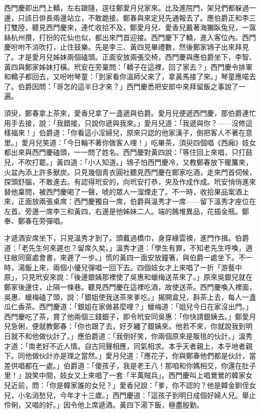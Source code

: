 西門慶即出門上轎，左右跟隨，逕往鄭愛月兒家來。比及進院門，架兒們都躲過一邊，只該日俳長兩邊站立，不敢跪接。鄭春與來定兒先通報去了。應伯爵正和李三打雙陸，聽見西門慶來，連忙收拾不及。鄭愛月兒、愛香兒戴著海獺臥兔兒，一窩絲杭州攢，打扮的花仙也似，都出來門首迎接。西門慶下了轎，進入客位內。西門慶吩咐不消吹打，止住鼓樂。先是李三、黃四見畢禮數，然後鄭家鴇子出來拜見了。才是愛月兒姊妹兩個磕頭。正面安放兩張交椅，西門慶與應伯爵坐下，李智、黃四與鄭家姊妹打橫。玳安在旁稟問：「轎子在這裡，回了家去？」西門慶令排軍和轎子都回去，又吩咐琴童：「到家看你溫師父來了，拿黃馬接了來。」琴童應喏去了。伯爵因問：「哥怎的這半日才來？」西門慶悉把安郎中來拜留飯之事說了一遍。

須臾，鄭春拿上茶來，愛香兒拿了一盞遞與伯爵。愛月兒便遞西門慶，那伯爵連忙用手去接，說：「我錯接，只說你遞與我來。」愛月兒道：「我遞與你？——沒修這樣福來！」伯爵道：「你看這小淫婦兒，原來只認的他家漢子，倒把客人不著在意里。」愛月兒笑道：「今日輪不著你做客人哩！」吃畢茶，須臾四個唱《西廂》妓女都出來與西門慶磕頭，一一問了姓名。西門慶對黃四說：「等住回上來唱，只打鼓兒，不吹打罷。」黃四道：「小人知道。」鴇子怕西門慶冷，又教鄭春放下暖簾來，火盆內添上許多獸炭。只見幾個青衣圓社聽見西門慶在鄭家吃酒，走來門首伺候，探頭舒腦，不敢進去。有認得玳安的，向玳安打恭，央及作成作成。玳安悄俏進來替他稟問，被西門慶喝了一聲，唬的眾人一溜煙走了。不一時，收拾果品案酒上來，正面放兩張桌席：西門慶獨自一席，伯爵與溫秀才一席——留下溫秀才座位在左首。旁邊一席李三和黃四，右邊是他姊妹二人。端的餚堆異品，花插金瓶。鄭奉、鄭春在旁彈唱。

才遞酒安席坐下，只見溫秀才到了。頭戴過橋巾，身穿綠雲襖，進門作揖。伯爵道：「老先生何來遲也？留席久矣。」溫秀才道：「學生有罪，不知老先生呼喚，適往敝同窗處會書，來遲了一步。」慌的黃四一面安放鐘箸，與伯爵一處坐下。不一時，湯飯上來，兩個小優兒彈唱一回下去。四個妓女才上來唱了一折「游藝中原」，只見玳安來說：「後邊銀姨那裡使了吳惠和蠟梅送茶來了。」原來吳銀兒就在鄭家後邊住，止隔一條巷。聽見西門慶在這裡吃酒，故使送茶。西門慶喚入裡面，吳惠、蠟梅磕了頭，說：「銀姐使我送茶來爹吃。」揭開盒兒，斟茶上去，每人一盞瓜仁香茶。西門慶道：「銀姐在家做甚麼哩？」蠟梅道：「姐兒今日在家沒出門。」西門慶吃了茶，賞了他兩個三錢銀子，即令玳安同吳惠：「你快請銀姨去。」鄭愛月兒急俐，便就教鄭春：「你也跟了去，好歹纏了銀姨來。他若不來，你就說我到明日就不和他做伙計了。」應伯爵道：「我倒好笑，你兩個原來是販毴的伙計。」溫秀才道：「南老好不近人情。自古同聲相應，同氣相求。本乎天者親上，本乎地者親下。同他做伙計亦是理之當然。」愛月兒道：「應花子，你與鄭春他們都是伙計，當差供唱都在一處。」伯爵道：「傻孩子，我是老王八！那咱和你媽相交，你還在肚子里！」說笑中間，妓女又上來唱了一套「半萬賊兵」。西門慶叫上唱鶯鶯的韓家女兒近前，問：「你是韓家誰的女兒？」愛香兒說：「爹，你不認的？他是韓金釧侄女兒，小名消愁兒，今年才十三歲。」西門慶道：「這孩子到明日成個好婦人兒。舉止伶俐，又唱的好。」因令他上席遞酒。黃四下湯下飯，極盡殷勤。

